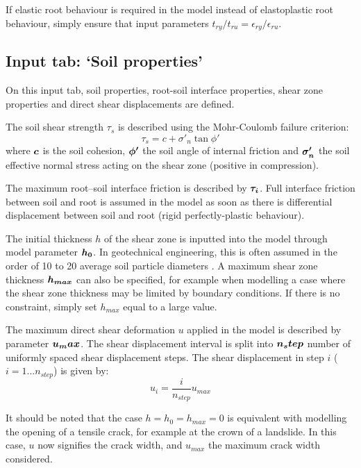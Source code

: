 \documentclass[a4 paper, 11  pt]{article}
\begin{document}
If elastic root behaviour is required in the model instead of elastoplastic root behaviour, simply ensure that input parameters $t_{ry}/t_{ru} = \epsilon_{ry}/\epsilon_{ru}$. 


\subsection{Input tab: `Soil properties'}
\label{sec:soilproperties}

On this input tab, soil properties, root-soil interface properties, shear zone properties and direct shear displacements are defined. 

The soil shear strength $\tau_s$ is described using the Mohr-Coulomb failure criterion:
\begin{equation}
	\tau_s = c + \sigma'_n \tan\phi'
\end{equation}
where $\vb*{c}$ is the soil cohesion, $\vb*{\phi'}$ the soil angle of internal friction and $\vb*{\sigma'_n}$ the soil effective normal stress acting on the shear zone (positive in compression).

The maximum root--soil interface friction is described by $\vb*{\tau_i}$. Full interface friction between soil and root is assumed in the model as soon as there is differential displacement between soil and root (rigid perfectly-plastic behaviour).

The initial thickness $h$ of the shear zone is inputted into the model through model parameter $\vb*{h_0}$. In geotechnical engineering, this is often assumed in the order of 10 to 20 average soil particle diameters \citep[e.g.][]{oda1999}. A maximum shear zone thickness $\vb*{h_{max}}$ can also be specified, for example when modelling a case where the shear zone thickness may be limited by boundary conditions. If there is no constraint, simply set $h_{max}$ equal to a large value.

The maximum direct shear deformation $u$ applied in the model is described by parameter $\vb*{u_max}$. The shear displacement interval is split into $\vb*{n_step}$ number of uniformly spaced shear displacement steps. The shear displacement in step $i$ ($i=1...n_{step}$) is given by:
\begin{equation}
	u_i = \frac{i}{n_{step}} u_{max}
\end{equation}

It should be noted that the case $h = h_0 = h_{max} = 0$ is equivalent with modelling the opening of a tensile crack, for example at the crown of a landslide. In this case, $u$ now signifies the crack width, and $u_{max}$ the maximum crack width considered.
\end{document}
